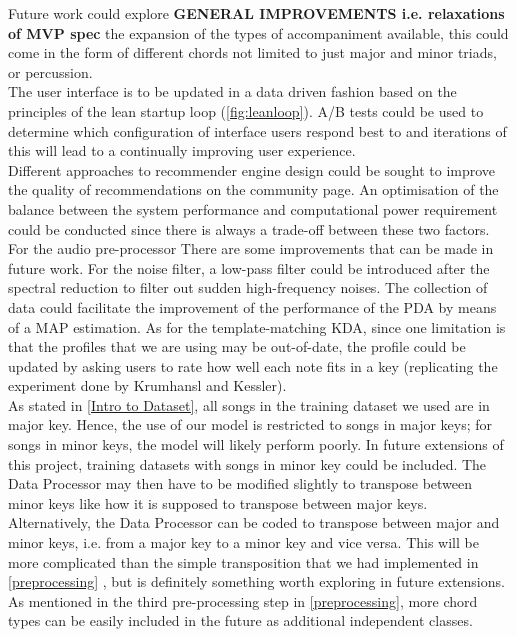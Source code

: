Future work could explore
\textbf{GENERAL IMPROVEMENTS i.e. relaxations of MVP spec} 
the expansion of the types of accompaniment available, this could come in the form of different chords not limited to just major and minor triads, or percussion.
\\
The user interface is to be updated in a data driven fashion based on the principles of the lean startup loop (\cref{fig:leanloop}). 
A/B tests could be used to determine which configuration of interface users respond best to and iterations of this will lead to a continually improving user experience.
\\
Different approaches to recommender engine design could be sought to improve the quality of recommendations on the community page. 
An optimisation of the balance between the system performance and computational power requirement could be conducted since there is always a trade-off between these two factors.
\\
For the audio pre-processor There are some improvements that can be made in future work. 
For the noise filter, a low-pass filter could be introduced after the spectral reduction to filter out sudden high-frequency noises. 
The collection of data could facilitate the improvement of the performance of the PDA by means of a MAP estimation. 
As for the template-matching KDA, since one limitation is that the profiles that we are using may be out-of-date, the profile could be updated by asking users to rate how well each note fits in a key (replicating the experiment done by Krumhansl and Kessler).
\\
As stated in \cref{Intro to Dataset}, all songs in the training dataset we used are in major key. 
Hence, the use of our model is restricted to songs in major keys; for songs in minor keys, the model will likely perform poorly. 
In future extensions of this project, training datasets with songs in minor key could be included.
The Data Processor may then have to be modified slightly to transpose between minor keys like how it is supposed to transpose between major keys. 
Alternatively, the Data Processor can be coded to transpose between major and minor keys, i.e. from a major key to a minor key and vice versa. 
This will be more complicated than the simple transposition that we had implemented in \cref{preprocessing} \cite{BasicMusicTheoryBook}, but is definitely something worth exploring in future extensions. 
\\
As mentioned in the third pre-processing step in \cref{preprocessing}, more chord types can be easily included in the future as additional independent classes. 

